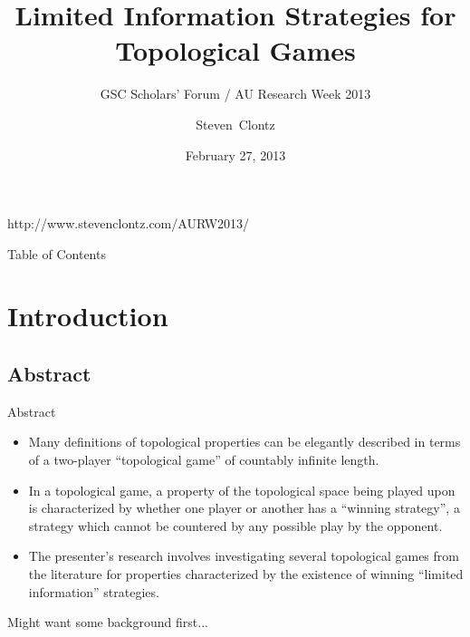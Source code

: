 \documentclass{beamer}
\title[Limited Information Strategies for Topological Games] %
{Limited Information Strategies for Topological Games}
\subtitle
{GSC Scholars' Forum / AU Research Week 2013} %
\author%
{Steven~Clontz}%
\institute[Auburn University] %
{
  Department of Mathematics and Statistics\\
  Auburn University}
\date[13-02-27] %
{February 27, 2013}
\begin{document}
\begin{frame}
  \titlepage

  {\tiny http://www.stevenclontz.com/AURW2013/}
\end{frame}

\begin{frame}{Table of Contents}
  \tableofcontents
\end{frame}




\section{Introduction}

\subsection{Abstract}

\begin{frame}{Abstract}%

  \begin{itemize}
  \item
    Many definitions of topological properties can be elegantly described in terms of a two-player ``topological game'' of countably infinite length. 
  \item
    In a topological game, a property of the topological space being played upon is characterized by whether one player or another has a ``winning strategy'', a strategy which cannot be countered by any possible play by the opponent. 
  \item 
    The presenter's research involves investigating several topological games from the literature for properties characterized by the existence of winning ``limited information'' strategies.
  \end{itemize}
  \pause
Might want some background first...
\end{frame}
\end{document}
